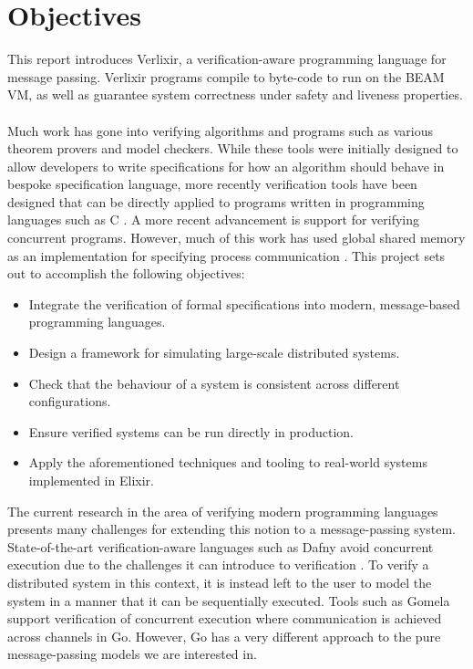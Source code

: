 \section{Objectives}
This report introduces Verlixir, a verification-aware programming language for message passing. Verlixir programs compile to byte-code to run on the BEAM VM, as well as guarantee system correctness under safety and liveness properties.
\\ \\
Much work has gone into verifying algorithms and programs such as various theorem provers and model checkers. While these tools were initially designed to allow developers to write specifications for how an algorithm should behave in bespoke specification language, more recently verification tools have been designed that can be directly applied to programs written in programming languages such as C \cite{c_to_promela}. A more recent advancement is support for verifying concurrent programs. However, much of this work has used global shared memory as an implementation for specifying process communication \cite{java_pathfinder}. This project sets out to accomplish the following objectives:
\begin{itemize}
    \item Integrate the verification of formal specifications into modern, message-based programming languages.
    \item Design a framework for simulating large-scale distributed systems.
    \item Check that the behaviour of a system is consistent across different configurations.
    \item Ensure verified systems can be run directly in production.
    \item Apply the aforementioned techniques and tooling to real-world systems implemented in Elixir.
\end{itemize}
The current research in the area of verifying modern programming languages presents many challenges for extending this notion to a message-passing system. State-of-the-art verification-aware languages such as Dafny avoid concurrent execution due to the challenges it can introduce to verification \cite{dafny_concurrency}. To verify a distributed system in this context, it is instead left to the user to model the system in a manner that it can be sequentially executed. Tools such as Gomela \cite{gomela} support verification of concurrent execution where communication is achieved across channels in Go. However, Go has a very different approach to the pure message-passing models we are interested in.
